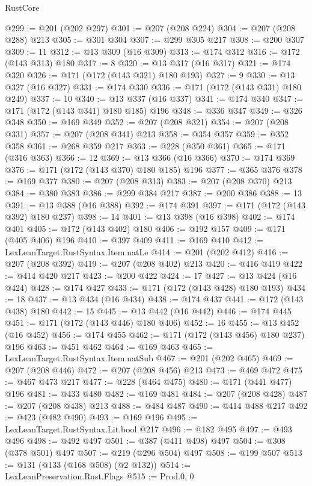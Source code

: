 \begin{lexlean}{RustCore}
\begin{coremodule}
@299 := @201 (@202 @297)
@301 := @207 (@208 @224)
@304 := @207 (@208 @288) @213
@305 := @301 @304
@307 := @299 @305 @217
@308 := @200 @307
@309 := 11
@312 := @13 @309 (@16 @309)
@313 := @174 @312
@316 := @172 (@143 @313) @180
@317 := 8
@320 := @13 @317 (@16 @317)
@321 := @174 @320
@326 := @171 (@172 (@143 @321) @180 @193)
@327 := 9
@330 := @13 @327 (@16 @327)
@331 := @174 @330
@336 := @171 (@172 (@143 @331) @180 @249)
@337 := 10
@340 := @13 @337 (@16 @337)
@341 := @174 @340
@347 := @171 (@172 (@143 @341) @180 @185) @196
@348 := @336 @347
@349 := @326 @348
@350 := @169 @349
@352 := @207 (@208 @321)
@354 := @207 (@208 @331)
@357 := @207 (@208 @341) @213
@358 := @354 @357
@359 := @352 @358
@361 := @268 @359 @217
@363 := @228 (@350 @361)
@365 := @171 (@316 @363)
@366 := 12
@369 := @13 @366 (@16 @366)
@370 := @174 @369
@376 := @171 (@172 (@143 @370) @180 @185) @196
@377 := @365 @376
@378 := @169 @377
@380 := @207 (@208 @313)
@383 := @207 (@208 @370) @213
@384 := @380 @383
@386 := @299 @384 @217
@387 := @200 @386
@388 := 13
@391 := @13 @388 (@16 @388)
@392 := @174 @391
@397 := @171 (@172 (@143 @392) @180 @237)
@398 := 14
@401 := @13 @398 (@16 @398)
@402 := @174 @401
@405 := @172 (@143 @402) @180
@406 := @192 @157
@409 := @171 (@405 @406) @196
@410 := @397 @409
@411 := @169 @410
@412 := LexLeanTarget.RustSyntax.Item.natLe
@414 := @201 (@202 @412)
@416 := @207 (@208 @392)
@419 := @207 (@208 @402) @213
@420 := @416 @419
@422 := @414 @420 @217
@423 := @200 @422
@424 := 17
@427 := @13 @424 (@16 @424)
@428 := @174 @427
@433 := @171 (@172 (@143 @428) @180 @193)
@434 := 18
@437 := @13 @434 (@16 @434)
@438 := @174 @437
@441 := @172 (@143 @438) @180
@442 := 15
@445 := @13 @442 (@16 @442)
@446 := @174 @445
@451 := @171 (@172 (@143 @446) @180 @406)
@452 := 16
@455 := @13 @452 (@16 @452)
@456 := @174 @455
@462 := @171 (@172 (@143 @456) @180 @237) @196
@463 := @451 @462
@464 := @169 @463
@465 := LexLeanTarget.RustSyntax.Item.natSub
@467 := @201 (@202 @465)
@469 := @207 (@208 @446)
@472 := @207 (@208 @456) @213
@473 := @469 @472
@475 := @467 @473 @217
@477 := @228 (@464 @475)
@480 := @171 (@441 @477) @196
@481 := @433 @480
@482 := @169 @481
@484 := @207 (@208 @428)
@487 := @207 (@208 @438) @213
@488 := @484 @487
@490 := @414 @488 @217
@492 := @423 (@482 @490)
@493 := @169 @196
@495 := LexLeanTarget.RustSyntax.Lit.bool @217
@496 := @182 @495
@497 := @493 @496
@498 := @492 @497
@501 := @387 (@411 @498) @497
@504 := @308 (@378 @501) @497
@507 := @219 (@296 @504) @497
@508 := @199 @507
@513 := @131 (@133 (@168 @508) (@2 @132))
@514 := LexLeanPreservation.Rust.Flags
@515 := Prod.{0, 0}

\end{coremodule}
\end{lexlean}
